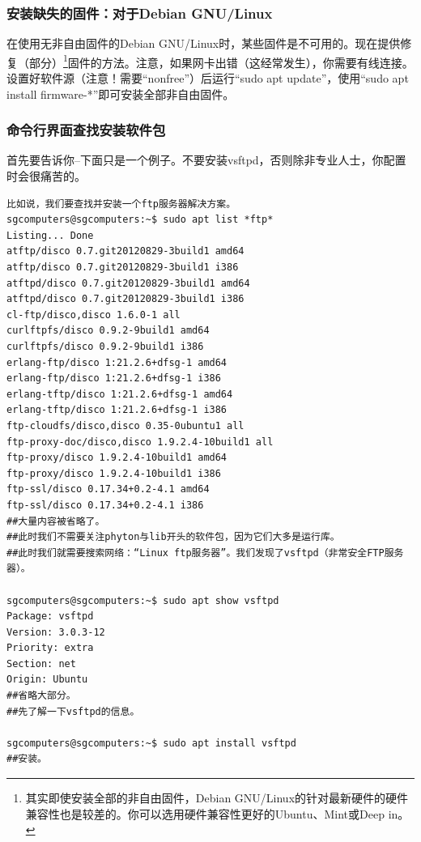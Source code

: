 \documentclass{book}
\begin{document}
\subsubsection{安装缺失的固件：对于Debian GNU/Linux}
在使用无非自由固件的Debian GNU/Linux时，某些固件是不可用的。现在提供修复（部分）\footnote{其实即使安装全部的非自由固件，Debian GNU/Linux的针对最新硬件的硬件兼容性也是较差的。你可以选用硬件兼容性更好的Ubuntu、Mint或Deep in。}固件的方法。注意，如果网卡出错（这经常发生），你需要有线连接。设置好软件源（注意！需要“nonfree”）后运行“sudo apt update”，使用“sudo apt install firmware-*”即可安装全部非自由固件。
\subsubsection{命令行界面查找安装软件包}
首先要告诉你--下面只是一个例子。不要安装vsftpd，否则除非专业人士，你配置时会很痛苦的。
\begin{verbatim}
比如说，我们要查找并安装一个ftp服务器解决方案。
sgcomputers@sgcomputers:~$ sudo apt list *ftp*
Listing... Done
atftp/disco 0.7.git20120829-3build1 amd64
atftp/disco 0.7.git20120829-3build1 i386
atftpd/disco 0.7.git20120829-3build1 amd64
atftpd/disco 0.7.git20120829-3build1 i386
cl-ftp/disco,disco 1.6.0-1 all
curlftpfs/disco 0.9.2-9build1 amd64
curlftpfs/disco 0.9.2-9build1 i386
erlang-ftp/disco 1:21.2.6+dfsg-1 amd64
erlang-ftp/disco 1:21.2.6+dfsg-1 i386
erlang-tftp/disco 1:21.2.6+dfsg-1 amd64
erlang-tftp/disco 1:21.2.6+dfsg-1 i386
ftp-cloudfs/disco,disco 0.35-0ubuntu1 all
ftp-proxy-doc/disco,disco 1.9.2.4-10build1 all
ftp-proxy/disco 1.9.2.4-10build1 amd64
ftp-proxy/disco 1.9.2.4-10build1 i386
ftp-ssl/disco 0.17.34+0.2-4.1 amd64
ftp-ssl/disco 0.17.34+0.2-4.1 i386
##大量内容被省略了。
##此时我们不需要关注phyton与lib开头的软件包，因为它们大多是运行库。
##此时我们就需要搜索网络：“Linux ftp服务器”。我们发现了vsftpd（非常安全FTP服务器）。

sgcomputers@sgcomputers:~$ sudo apt show vsftpd
Package: vsftpd
Version: 3.0.3-12
Priority: extra
Section: net
Origin: Ubuntu
##省略大部分。
##先了解一下vsftpd的信息。

sgcomputers@sgcomputers:~$ sudo apt install vsftpd
##安装。
\end{verbatim}
\end{document}
